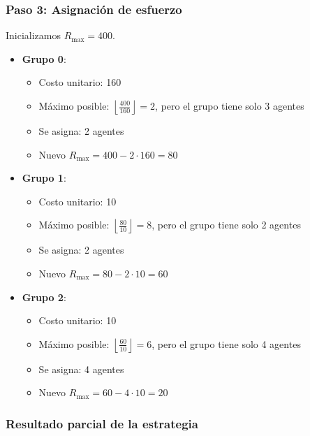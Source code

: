 \documentclass[11pt,letter]{article}
\begin{document}
\subsubsection*{Paso 3: Asignación de esfuerzo}

Inicializamos $R_{\text{max}} = 400$.

\begin{itemize}
    \item \textbf{Grupo 0}:
        \begin{itemize}
            \item Costo unitario: 160
            \item Máximo posible: $\left\lfloor \frac{400}{160} \right\rfloor = 2$, pero el grupo tiene solo 3 agentes
            \item Se asigna: 2 agentes
            \item Nuevo $R_{\text{max}} = 400 - 2 \cdot 160 = 80$
        \end{itemize}

    \item \textbf{Grupo 1}:
        \begin{itemize}
            \item Costo unitario: 10
            \item Máximo posible: $\left\lfloor \frac{80}{10} \right\rfloor = 8$, pero el grupo tiene solo 2 agentes
            \item Se asigna: 2 agentes
            \item Nuevo $R_{\text{max}} = 80 - 2 \cdot 10 = 60$
        \end{itemize}

    \item \textbf{Grupo 2}:
        \begin{itemize}
            \item Costo unitario: 10
            \item Máximo posible: $\left\lfloor \frac{60}{10} \right\rfloor = 6$, pero el grupo tiene solo 4 agentes
            \item Se asigna: 4 agentes
            \item Nuevo $R_{\text{max}} = 60 - 4 \cdot 10 = 20$
        \end{itemize}
\end{itemize}

\subsubsection*{Resultado parcial de la estrategia}
\end{document}
